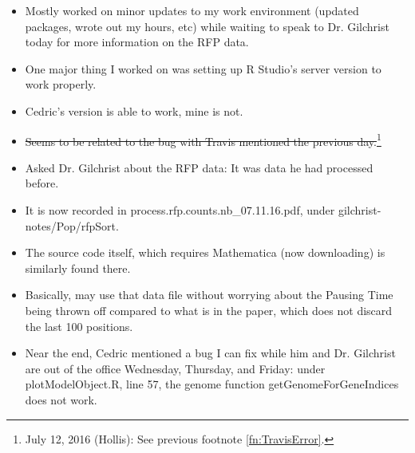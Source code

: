 \documentclass[12pt,hyperref]{labbook}
\newcommand{\sep}{\discretionary{}{}{}} %
\begin{document}

\begin {itemize}
    \item Mostly worked on minor updates to my work environment (updated packages, wrote out my hours, etc) while waiting to speak to Dr. Gilchrist today for more information on the RFP data.
    \item One major thing I worked on was setting up R Studio's server version to work properly.
    \item Cedric's version is able to work, mine is not.
    \item \sout{Seems to be related to the bug with Travis mentioned the previous day.}\footnote{July 12, 2016 (Hollis): See previous footnote \ref{fn:TravisError}.}
    \item Asked Dr. Gilchrist about the RFP data: It was data he had processed before.
    \item It is now recorded in process\sep .\sep rfp\sep .\sep counts\sep .\sep nb\sep \_\sep 07\sep .\sep 11\sep .\sep 16\sep .\sep pdf, under gilchrist\sep -\sep notes\sep /\sep Pop\sep /\sep rfpSort.
    \item The source code itself, which requires Mathematica (now downloading) is similarly found there.
    \item Basically, may use that data file without worrying about the Pausing Time being thrown off compared to what is in the paper, which does not discard the last 100 positions.
    \item Near the end, Cedric mentioned a bug I can fix while him and Dr. Gilchrist are out of the office Wednesday, Thursday, and Friday: under plotModelObject.R, line 57, the genome function getGenomeForGeneIndices does not work.
\end{itemize}

\end{document}
